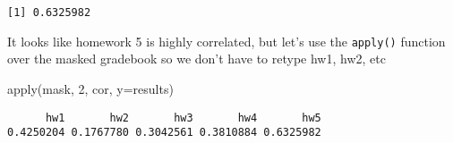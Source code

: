 \documentclass[
  letterpaper,
  DIV=11,
  numbers=noendperiod]{scrartcl}
\newenvironment{Shaded}{\begin{snugshade}}{\end{snugshade}}
\newcommand{\AttributeTok}[1]{\textcolor[rgb]{0.40,0.45,0.13}{#1}}
\newcommand{\DecValTok}[1]{\textcolor[rgb]{0.68,0.00,0.00}{#1}}
\newcommand{\FunctionTok}[1]{\textcolor[rgb]{0.28,0.35,0.67}{#1}}
\newcommand{\NormalTok}[1]{\textcolor[rgb]{0.00,0.23,0.31}{#1}}
\newcommand{\SpecialCharTok}[1]{\textcolor[rgb]{0.37,0.37,0.37}{#1}}
\begin{document}
\begin{Shaded}
\end{Shaded}

\begin{verbatim}
[1] 0.6325982
\end{verbatim}

It looks like homework 5 is highly correlated, but let's use the
\texttt{apply()} function over the masked gradebook so we don't have to
retype hw1, hw2, etc

\begin{Shaded}
\begin{Highlighting}[]
\FunctionTok{apply}\NormalTok{(mask, }\DecValTok{2}\NormalTok{, cor, }\AttributeTok{y=}\NormalTok{results)}
\end{Highlighting}
\end{Shaded}

\begin{verbatim}
      hw1       hw2       hw3       hw4       hw5 
0.4250204 0.1767780 0.3042561 0.3810884 0.6325982 
\end{verbatim}
\end{document}
